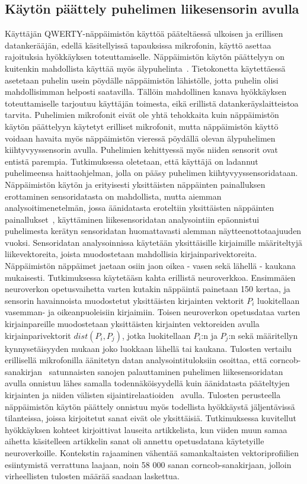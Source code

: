 \documentclass[finnish]{tktltiki2}
\theoremstyle{definition}
\theoremstyle{remark}
\begin{document}
\subsection{Käytön päättely puhelimen liikesensorin avulla}
Käyttäjän QWERTY-näppäimistön käyttöä pääteltäessä ulkoisen ja erillisen datankerääjän, edellä käsitellyissä tapauksissa mikrofonin, käyttö asettaa rajoituksia hyökkäyksen toteuttamiselle. Näppäimistön käytön päättelyyn on kuitenkin mahdollista käyttää myös älypuhelinta~\cite{mar}. Tietokonetta käytettäessä asetetaan puhelin usein pöydälle näppäimistön lähistölle, jotta puhelin olisi mahdollisimman helposti saatavilla. Tällöin mahdollinen kanava hyökkäyksen toteuttamiselle tarjoutuu käyttäjän toimesta, eikä erillistä datankeräyslaitteistoa tarvita. Puhelimien mikrofonit eivät ole yhtä tehokkaita kuin näppäimistön käytön päättelyyn käytetyt erilliset mikrofonit, mutta näppäimistön käyttö voidaan havaita myös näppäimistön vieressä pöydällä olevan älypuhelimen kiihtyvyyssensorin avulla. Puhelimien kehittyessä myös niiden sensorit ovat entistä parempia. 
Tutkimuksessa oletetaan, että käyttäjä on ladannut puhelimeensa haittaohjelman, jolla on pääsy puhelimen kiihtyvyyssensoridataan. Näppäimistön käytön ja erityisesti yksittäisten näppäinten painalluksen erottaminen sensoridatasta on mahdollista, mutta aiemman analysoitimenetelmän, jossa äänidatasta eroteltiin yksittäisten näppäinten painallukset~\cite{aso}, käyttäminen liikesensoridatan analysointiin epäonnistui puhelimesta kerätyn sensoridatan huomattavasti alemman näytteenottotaajuuden vuoksi. Sensoridatan analysoinnissa  käytetään yksittäisille kirjaimille määriteltyjä liikevektoreita, joista muodostetaan mahdollisia kirjainparivektoreita. Näppäimistön näppäimet jaetaan osiin jaon oikea - vasen sekä lähellä - kaukana mukaisesti. Tutkimuksessa käytetääsn kahta erillistä neuroverkkoa. Ensimmäien neuroverkon opetusvaihetta varten kutakin näppäintä painetaan 150 kertaa, ja sensorin havainnoista muodostetut yksittäisten kirjainten vektorit $P_i$ luokitellaan vasemman- ja oikeanpuoleisiin kirjaimiin. Toisen neuroverkon opetusdataa varten kirjainpareille muodostetaan yksittäisten kirjainten vektoreiden avulla kirjainparivektorit $dist(P_i,P_j)$, jotka luokitellaan $P_i$:n ja $P_j$:n sekä määritellyn kynnysetäisyyden mukaan joko luokkaan lähellä tai kaukana. Tulosten vertailu erillisellä mikrofonilla äänitetyn datan analysointituloksiin osoittaa, että corncob-sanakirjan~\cite{corn} satunnaisten sanojen palauttaminen puhelimen liikesensoridatan avulla onnistuu lähes samalla todennäköisyydellä kuin äänidatasta pääteltyjen kirjainten ja niiden välisten sijaintirelaatioiden~\cite{berger} avulla. Tulosten perusteella näppäimistön käytön päättely onnistuu myös todellista hyökkäystä jäljentävissä tilanteissa, joissa kirjoitetut sanat eivät ole yksittäisiä. Tutkimuksessa kuvitellut hyökkäyksen kohteet kirjoittivat lauseita artikkelista, kun viiden muun samaa aihetta käsitelleen artikkelin sanat oli annettu opetusdatana käytetyille neuroverkoille. Kontekstin rajaaminen vähentää samankaltaisten vektoriprofiilien esiintymistä verrattuna laajaan, noin 58 000 sanan corncob-sanakirjaan, jolloin virheellisten tulosten määrää saadaan laskettua.
 
\end{document}
